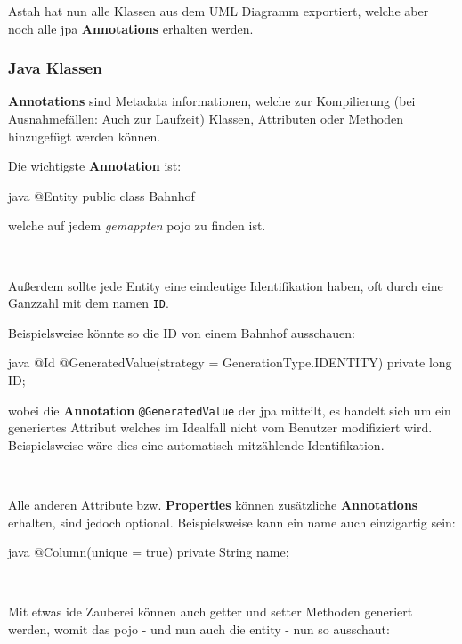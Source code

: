 Astah hat nun alle Klassen aus dem UML Diagramm exportiert, welche aber noch alle \gls{jpa} \textbf{Annotations} erhalten werden.

\subsubsection{Java Klassen}

\textbf{Annotations} sind Metadata informationen, welche zur Kompilierung (bei Ausnahmefällen: Auch zur Laufzeit) Klassen, Attributen oder Methoden hinzugefügt werden können.

Die wichtigste \textbf{Annotation} ist:
\begin{code}{java}
@Entity
public class Bahnhof {}
\end{code}

welche auf jedem \textit{gemappten} \cite{wiki:mapping} \gls{pojo} zu finden ist.

\

Außerdem sollte jede Entity eine eindeutige Identifikation haben, oft durch eine Ganzzahl mit dem namen \texttt{ID}.

Beispielsweise könnte so die ID von einem Bahnhof ausschauen:

\begin{code}{java}
@Id
@GeneratedValue(strategy = GenerationType.IDENTITY)
private long ID;
\end{code}

wobei die \textbf{Annotation} \texttt{@GeneratedValue} der \gls{jpa} mitteilt, es handelt sich um ein generiertes Attribut welches im Idealfall nicht vom Benutzer modifiziert wird. Beispielsweise wäre dies eine automatisch mitzählende Identifikation.

\

Alle anderen Attribute bzw. \textbf{Properties} können zusätzliche \textbf{Annotations} erhalten, sind jedoch optional. Beispielsweise kann ein name auch einzigartig sein:

\begin{code}{java}
@Column(unique = true)
private String name;
\end{code}

\

Mit etwas \gls{ide} Zauberei können auch getter und setter Methoden generiert werden, womit das \gls{pojo} - und nun auch die \gls{entity} - nun so ausschaut:

